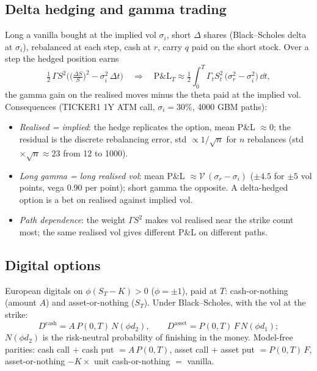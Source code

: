 \subsection{Delta hedging and gamma trading}\label{sec:mp-hedging}
Long a vanilla bought at the implied vol $\sigma_i$, short $\Delta$ shares (Black--Scholes delta at $\sigma_i$), rebalanced at
each step, cash at $r$, carry $q$ paid on the short stock. Over a step the hedged position earns
\[
  \tfrac12\,\Gamma S^2\Big(\big(\tfrac{\Delta S}{S}\big)^2 - \sigma_i^2\,\Delta t\Big)
  \quad\Longrightarrow\quad
  \text{P\&L}_T \approx \tfrac12 \int_0^T \Gamma_t S_t^2\,\big(\sigma_r^2 - \sigma_i^2\big)\,\dd t,
\]
the gamma gain on the realised moves minus the theta paid at the implied vol. Consequences (TICKER1 1Y ATM call,
$\sigma_i = 30\%$, 4000 GBM paths):
\begin{itemize}[nosep]
  \item \emph{Realised = implied}: the hedge replicates the option, mean P\&L $\approx 0$; the residual is the discrete
        rebalancing error, std $\propto 1/\sqrt n$ for $n$ rebalances (std $\times \sqrt n \approx 23$ from 12 to 1000).
  \item \emph{Long gamma = long realised vol}: mean P\&L $\approx \mathcal{V}\,(\sigma_r - \sigma_i)$ ($\pm 4.5$ for $\pm 5$ vol points,
        vega 0.90 per point); short gamma the opposite. A delta-hedged option is a bet on realised against implied vol.
  \item \emph{Path dependence}: the weight $\Gamma S^2$ makes vol realised near the strike count most; the same realised
        vol gives different P\&L on different paths.
\end{itemize}

\subsection{Digital options}\label{sec:mp-digital}
European digitals on $\phi(S_T - K) > 0$ ($\phi = \pm 1$), paid at $T$: cash-or-nothing (amount $A$) and asset-or-nothing
($S_T$). Under Black--Scholes, with the vol at the strike:
\[
  D^{\mathrm{cash}} = A\,P(0,T)\,N(\phi d_2),\qquad D^{\mathrm{asset}} = P(0,T)\,F\,N(\phi d_1);
\]
$N(\phi d_2)$ is the risk-neutral probability of finishing in the money. Model-free parities: cash call + cash put
$= A\,P(0,T)$, asset call + asset put $= P(0,T)\,F$, asset-or-nothing $- K\times$ unit cash-or-nothing $=$ vanilla.

